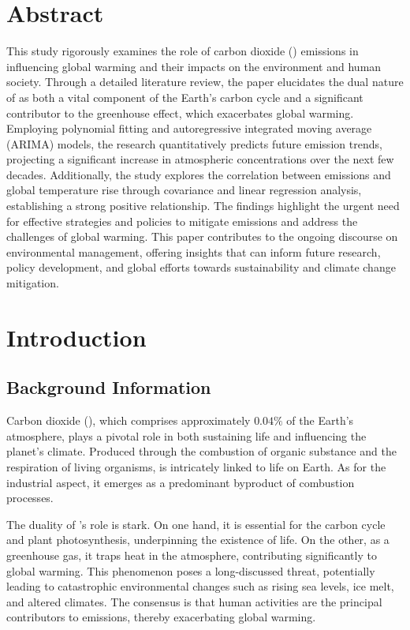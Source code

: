 \documentclass[12pt,a4paper]{article}
\begin{document}
    \epqtitle
    \newpage
    \tableofcontents    
    \newpage  
    \setlength{\parindent}{2em}
    
    \section{Abstract}
    This study rigorously examines the role of carbon dioxide () emissions in influencing global warming and their impacts on the environment and human society. Through a detailed literature review, the paper elucidates the dual nature of  as both a vital component of the Earth's carbon cycle and a significant contributor to the greenhouse effect, which exacerbates global warming. Employing polynomial fitting and autoregressive integrated moving average (ARIMA) models, the research quantitatively predicts future  emission trends, projecting a significant increase in atmospheric  concentrations over the next few decades. Additionally, the study explores the correlation between  emissions and global temperature rise through covariance and linear regression analysis, establishing a strong positive relationship. The findings highlight the urgent need for effective strategies and policies to mitigate  emissions and address the challenges of global warming. This paper contributes to the ongoing discourse on environmental management, offering insights that can inform future research, policy development, and global efforts towards sustainability and climate change mitigation.

    \section{Introduction}
    \subsection{Background Information}
    Carbon dioxide (), which comprises approximately $0.04\%$ of the Earth's atmosphere, plays a pivotal role in both sustaining life and influencing the planet's climate. Produced through the combustion of organic substance and the respiration of living organisms,  is intricately linked to life on Earth. As for the industrial aspect, it emerges as a predominant byproduct of combustion processes.

    The duality of 's role is stark. On one hand, it is essential for the carbon cycle and plant photosynthesis, underpinning the existence of life. On the other, as a greenhouse gas, it traps heat in the atmosphere, contributing significantly to global warming. This phenomenon poses a long-discussed threat, potentially leading to catastrophic environmental changes such as rising sea levels, ice melt, and altered climates. The consensus is that human activities are the principal contributors to  emissions, thereby exacerbating global warming.
\end{document}
